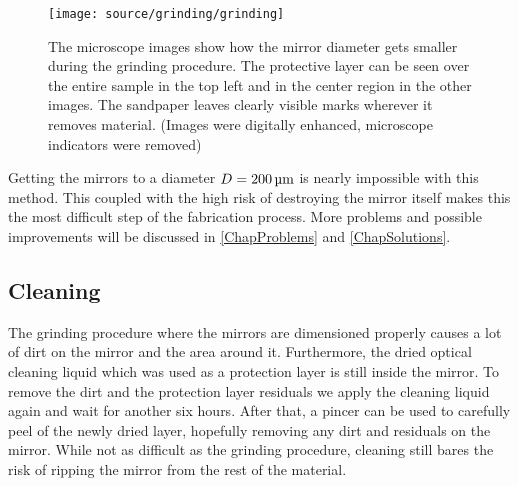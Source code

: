 \begin{figure}[H]
	\texttt{[image: source/grinding/grinding]}
	\caption{The microscope images show how the mirror diameter gets smaller during the grinding procedure. The protective layer can be seen over the entire sample in the top left and in the center region in the other images. The sandpaper leaves clearly visible marks wherever it removes material. (Images were digitally enhanced, microscope indicators were removed)}
	\label{fig:GrindingMicroscope}
\end{figure}
Getting the mirrors to a diameter $D=200\um$ is nearly impossible with this method. This coupled with the high risk of destroying the mirror itself makes this the most difficult step of the fabrication process. More problems and possible improvements will be discussed in \autoref{ChapProblems} and \autoref{ChapSolutions}.

\subsection{Cleaning}
The grinding procedure where the mirrors are dimensioned properly causes a lot of dirt on the mirror and the area around it. Furthermore, the dried optical cleaning liquid which was used as a protection layer is still inside the mirror. To remove the dirt and the protection layer residuals we apply the cleaning liquid again and wait for another six hours. After that, a pincer can be used to carefully peel of the newly dried layer, hopefully removing any dirt and residuals on the mirror. While not as difficult as the grinding procedure, cleaning still bares the risk of ripping the mirror from the rest of the material.

